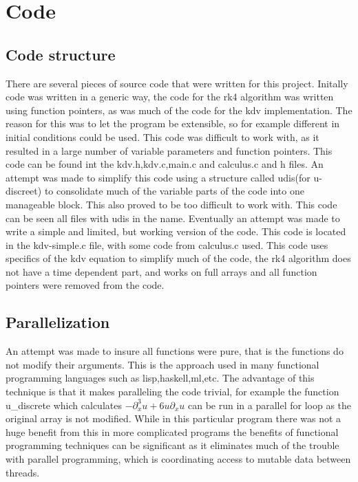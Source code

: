 \documentclass{article}
\begin{document}
\section{Code}
\subsection{Code structure}
There are several pieces of source code that were written for this
project. Initally code was written in a generic way, the code for the rk4
algorithm was written using function pointers, as was much of the code for the
kdv implementation. The reason for this was to let the program be extensible,
so for example different in initial conditions could be used. This code was
difficult to work with, as it resulted in a large number of variable parameters
and function pointers. This code can be found int the kdv.h,kdv.c,main.c and
calculus.c and h files. An attempt was made to simplify this code using a
structure called udis(for u-discreet) to consolidate much of the variable
parts of the code into one manageable block. This also proved to be too
difficult to work with. This code can be seen all files with udis in the
name. Eventually an attempt was made to write a simple and limited, but working
version of the code. This code is located in the kdv-simple.c file, with some
code from calculus.c used. This code uses specifics of the kdv equation to
simplify much of the code, the rk4 algorithm does not have a time dependent
part, and works on full arrays and all function pointers were removed from the
code.
\subsection{Parallelization}
An attempt was made to insure all functions were pure, that is the
functions do not modify their arguments. This is the approach used in many
functional programming languages such as lisp,haskell,ml,etc. The advantage of
this technique is that it makes paralleling the code trivial, for example the
function u\_discrete which calculates \(-\partial_x^3u+6u\partial_xu\) can be
run in a parallel for loop as the original array is not modified. While in this
particular program there was not a huge benefit from this in more complicated
programs the benefits of functional programming techniques can be significant
as it eliminates much of the trouble with parallel programming, which is
coordinating access to mutable data between threads.
\end{document}
